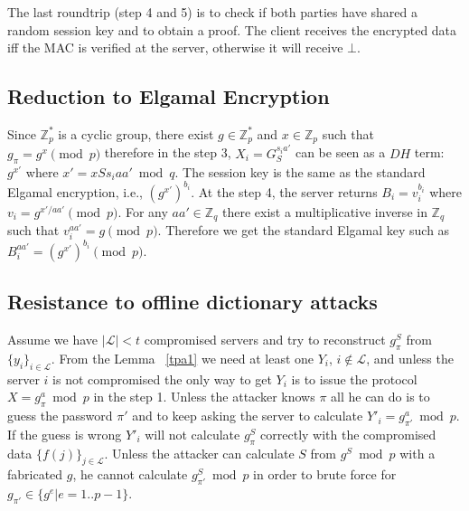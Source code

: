 The last roundtrip (step 4 and 5) is to check if both parties have
shared a random session key and to obtain a proof. The client receives
the encrypted data iff the MAC is verified at the server, otherwise it
will receive $\bot$.

\subsection{Reduction to Elgamal Encryption}
Since $\mathbb{Z}_p^*$ is a cyclic group, there exist $g \in
\mathbb{Z}_p^*$ and $x \in \mathbb{Z}_p$ such that $g_{\pi} = g^x
\pmod p$ therefore in the step 3, $X_i = G_S^{s_ia'}$ can be
seen as a $DH$ term: $g^{x'}$ where $x' = xSs_iaa' \bmod q$. The
session key is the same as the standard Elgamal encryption, i.e.,
$(g^{x'})^{b_i}$.
At the step 4, the server returns $B_i = v_i^{b_i}$ where $v_i =
g^{x'/aa'} \pmod p$. For any $aa' \in \mathbb{Z}_q$ there exist a
multiplicative inverse in $\mathbb{Z}_q$ such that $v_i^{aa'} = g
\pmod p$. Therefore we get the standard Elgamal key such as $B_i^{aa'}
= (g^{x'})^{b_i} \pmod p$.

\subsection{Resistance to offline dictionary attacks}
Assume we have $|\mathcal{L}| < t$ compromised servers and try to
reconstruct $g_{\pi}^S$ from $\{y_i\}_{i \in \mathcal{L}}$.
From the Lemma ~\ref{tpa1} we need at least one $Y_i$, $i \notin
\mathcal{L}$, and unless the server $i$ is not compromised the only
way to get $Y_i$ is to issue the protocol $X = g_{\pi}^a \bmod
p$ in the step 1.
Unless the attacker knows $\pi$ all he can do is to guess the
password $\pi'$ and to keep asking the server to calculate $Y'_i =
g_{\pi'}^a \bmod p$. If the guess is wrong $Y'_i$ will not
calculate $g_{\pi}^S$ correctly with the compromised data $\{f(j)\}_{j
\in \mathcal{L}}$.
Unless the attacker can calculate $S$ from $g^S \bmod p$ with a
fabricated $g$, he cannot calculate $g_{\pi'}^S \bmod p$ in
order to brute force for $g_{\pi'} \in \{g^e | e = 1..p-1\}$.

